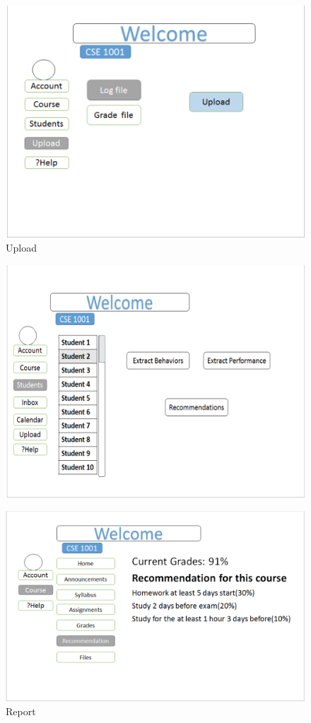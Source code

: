 \documentclass[12pt]{article}
\begin{document}
\begin{figure}
\caption{Upload}
\includegraphics[width=\textwidth]{img/6} 
\end{figure}
\begin{figure}
\includegraphics[width=\textwidth]{img/7}
\end{figure}

\begin{figure}
\caption{Report}
\includegraphics[width=\textwidth]{img/8} 
\end{figure}
\end{document}
